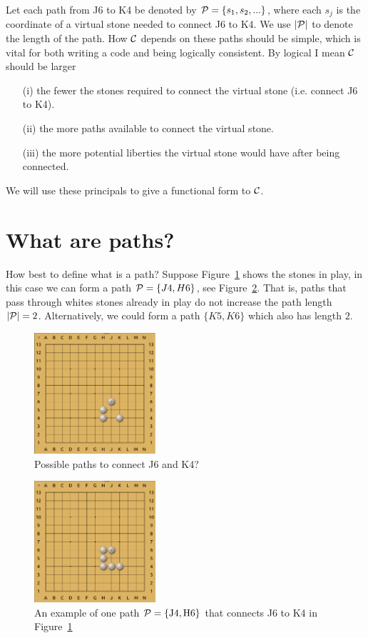 \documentclass[doublespacing, 12pt, a4paper]{article}
\begin{document}
Let each path from J6 to K4 be denoted by $\mathcal P = \{s_1, s_2,...\}$, where each $s_j$ is the coordinate of a virtual stone needed to connect J6 to K4. We use $|\mathcal P|$ to denote the length of the path.
How $\mathcal C$ depends on these paths should be simple, which is vital for both writing a code and being logically consistent. By logical I mean $\mathcal C$ should be larger
\begin{enumerate}
\item[(i)] the fewer the stones required to connect the virtual stone (i.e. connect J6 to K4).
\item[(ii)] the more paths available to connect the virtual stone.
\item[(iii)] the more potential liberties the virtual stone would have after being connected.
\end{enumerate}
We will use these principals to give a functional form to $\mathcal C$.

\section*{What are paths?}

How best to define what is a path?
Suppose Figure~\ref{fig:PathThroughWhite} shows the stones in play, in this case we can form a path
$\mathcal P = \{J4, H6\}$, see Figure~\ref{fig:PathThroughWhite2}. That is, paths that pass through whites stones already in play do not increase the path length $|\mathcal P| =2$. Alternatively, we could form a path $\{K5, K6\}$ which also has length $2$.
\begin{figure}
\centering
\includegraphics[width=0.4\textwidth]{PathThroughWhite}
\caption{Possible paths to connect J6 and K4?}
\label{fig:PathThroughWhite}
\end{figure}

\begin{figure}
\centering
\includegraphics[width=0.4\textwidth]{PathThroughWhite2}
\caption{An example of one path $\mathcal P = \{\mathrm{J4},\mathrm{H6}\}$ that connects J6 to K4 in Figure~\ref{fig:PathThroughWhite}}
\label{fig:PathThroughWhite2}
\end{figure}
\end{document}
